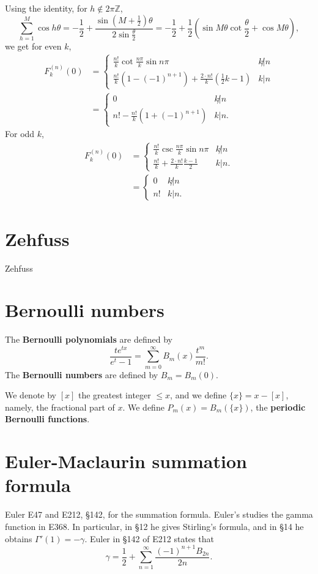 \documentclass{article}
\begin{document}
Using the identity, for $h \not \in 2\pi \mathbb{Z}$,
\[
\sum_{h=1}^M \cos h\theta = - \frac{1}{2}+\frac{\sin\left(M+\frac{1}{2}\right)\theta}{2\sin\frac{\theta}{2}}
=-\frac{1}{2}+\frac{1}{2}\left(\sin M\theta \cot \frac{\theta}{2}+\cos M \theta\right),
\] 
we  get for even $k$,
\begin{align*}
F_k^{(n)}(0) &= \begin{cases}
\frac{n!}{k} \cot \frac{n\pi}{k} \sin n\pi&k \not | n\\
\frac{n!}{k}(1-(-1)^{n+1})
+\frac{2\cdot n!}{k} \left(\frac{1}{2}k-1\right)
&k  | n
\end{cases}\\
&=\begin{cases}
0&k \not | n\\
n!-\frac{n!}{k}(1+(-1)^{n+1})& k| n.
\end{cases}
\end{align*}
For odd $k$,
\begin{align*}
F_k^{(n)}(0) 
&=\begin{cases}
\frac{n!}{k} \csc \frac{n\pi}{k} \sin n\pi&k \not | n\\
\frac{n!}{k}+\frac{2\cdot n!}{k} \frac{k-1}{2}&k | n.
\end{cases}\\
&=\begin{cases}
0&k \not | n\\
n!&k|n.
\end{cases}
\end{align*}



\section{Zehfuss}
Zehfuss \cite{zehfuss}

\section{Bernoulli numbers}
The \textbf{Bernoulli polynomials} are defined by
\[
\frac{te^{tx}}{e^t-1} = \sum_{m=0}^\infty B_m(x) \frac{t^m}{m!}.
\]
The \textbf{Bernoulli numbers} are defined by $B_m=B_m(0)$. 

We denote by $[x]$ the greatest integer $\leq x$, and we define $\{x\}=x-[x]$, namely, the fractional part of $x$.
We define $P_m(x)=B_m(\{x\})$, the \textbf{periodic Bernoulli functions}.



\section{Euler-Maclaurin summation formula}
Euler E47 and E212, \S 142, for the summation formula. Euler's studies the gamma function in E368. In particular,
in \S 12 he gives Stirling's formula, and
in \S 14 he obtains $\Gamma'(1)=-\gamma$. 
Euler in \S 142 of E212 states that
\[
\gamma = \frac{1}{2}+\sum_{n=1}^\infty \frac{(-1)^{n+1}B_{2n}}{2n}.
\]
\end{document}
